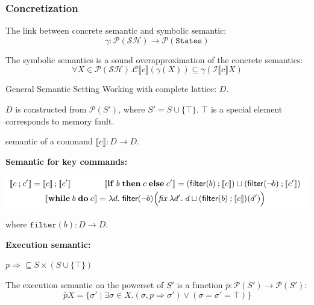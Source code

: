 \documentclass[aspectratio=1610, 13pt]{beamer}
\begin{document}
\begin{frame}\frametitle{Concretization}

The link between concrete semantic and symbolic semantic:
\large
\[\gamma: \mathcal{P(SH)}\rightarrow\mathcal{P}(\texttt{States})\]
\small

\begin{theorem}
The symbolic semantics is a sound overapproximation of the concrete semantics:
\[\forall X\in \mathcal{P(SH)}. \mathcal{C}\llbracket c\rrbracket(\gamma(X))\subseteq \gamma(\mathcal{I}\llbracket c\rrbracket X)\]
\end{theorem}

\end{frame}

\begin{frame}{General Semantic Setting}
    Working with complete lattice: $D$. 
    
    $D$ is constructed from $\mathcal{P}(S')$, where $S' = S \cup \{\top\}$. $\top$ is a special element corresponds to memory fault.
    
    semantic of a command $\llbracket c\rrbracket: D \rightarrow D$.
    
    \textbf{Semantic for key commands:}
    \begin{center}
        \includegraphics[scale=0.4]{semantic.png}
    \end{center}
    where $\texttt{filter}(b): D \rightarrow D$.
    
    \textbf{Execution semantic:}
    
    $p\Longrightarrow\subseteq S\times(S\cup \{\top\})$
    
    The execution semantic on the powerset of $S'$ is a function $\bar{p}: \mathcal{P}(S') \rightarrow \mathcal{P}(S')$: 
    \[\bar{p} X = \{\sigma'\mid \exists \sigma \in X. (\sigma, p \Longrightarrow \sigma') \vee (\sigma = \sigma' = \top)\}\]
\end{frame}
\end{document}
